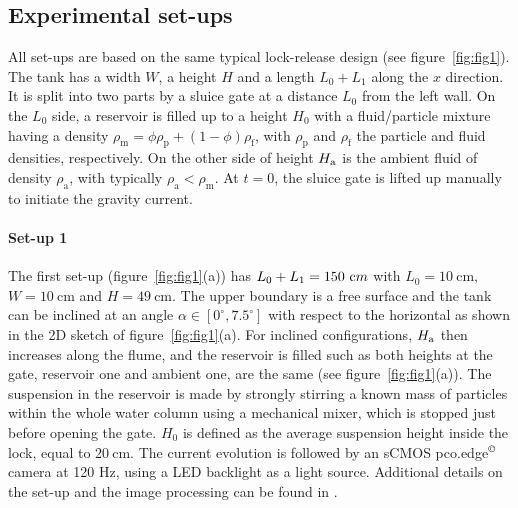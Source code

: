 \documentclass[12pt]{article}
\begin{document}
\subsection{Experimental set-ups}

All set-ups are based on the same typical lock-release design (see figure~\ref{fig:fig1}). The tank has a width $W$, a height $H$ and a length $L_0 + L_1$ along the $x$ direction. It is split into two parts by a sluice gate at a distance $L_0$ from the left wall. %
On the $L_0$ side, a reservoir is filled up to a height $H_0$ with a fluid/particle mixture having a density $\rho_{\text{m}} = \phi \rho_{\text{p}} + (1 - \phi)\rho_{\text{f}}$, with $\rho_{\text{p}}$ and $\rho_{\text{f}}$ the particle and fluid densities, respectively. On the other side of height $H_{\text a}$ is the ambient fluid of density $\rho_{\text{a}}$, with typically $\rho_{\text{a}} < \rho_{\text{m}}$. At $t = 0$, the sluice gate is lifted up manually to initiate the gravity current.

\paragraph{Set-up 1}

The first set-up (figure~\ref{fig:fig1}(a)) has $L_0+L_1=150~{\text cm}$ with $L_0 = 10~\textrm{cm}$, $W = 10~\textrm{cm}$ and $H=49~\textrm{cm}$. The upper boundary is a free surface and the tank can be inclined at an angle $\alpha\in[0^\circ,7.5^\circ]$ with respect to the horizontal as shown in the 2D sketch of figure~\ref{fig:fig1}(a). For inclined configurations, $H_{\text a}$ then increases along the flume, and the reservoir is filled such as both heights at the gate, reservoir one and ambient one, are the same (see figure~\ref{fig:fig1}(a)). The suspension in the reservoir is made by strongly stirring a known mass of particles within the whole water column using a mechanical mixer, which is stopped just before opening the gate. $H_{0}$ is defined as the average suspension height inside the lock, equal to $20~\textrm{cm}$.
%
The current evolution is followed by an sCMOS pco.edge$^\copyright$ camera at 120 Hz, using a LED backlight as a light source. Additional details on the set-up and the image processing can be found in \citet{Gadal2023}.
\end{document}
